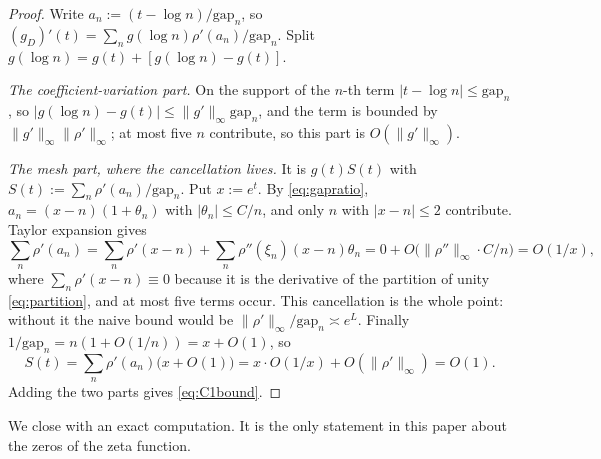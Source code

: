 \documentclass[11pt]{amsart}
\theoremstyle{definition}
\theoremstyle{remark}
\begin{document}
\begin{proof}
Write $a_n:=(t-\log n)/\mathrm{gap}_n$, so
$(g_D)'(t)=\sum_ng(\log n)\rho'(a_n)/\mathrm{gap}_n$. Split
$g(\log n)=g(t)+[g(\log n)-g(t)]$.

\emph{The coefficient-variation part.} On the support of the $n$-th term
$|t-\log n|\le\mathrm{gap}_n$, so
$|g(\log n)-g(t)|\le\|g'\|_\infty\mathrm{gap}_n$, and the term is bounded by
$\|g'\|_\infty\|\rho'\|_\infty$; at most five $n$ contribute, so this part is
$O(\|g'\|_\infty)$.

\emph{The mesh part, where the cancellation lives.} It is $g(t)S(t)$ with
$S(t):=\sum_n\rho'(a_n)/\mathrm{gap}_n$. Put $x:=e^t$. By
\eqref{eq:gapratio}, $a_n=(x-n)(1+\theta_n)$ with $|\theta_n|\le C/n$, and only
$n$ with $|x-n|\le2$ contribute. Taylor expansion gives
\[
  \sum_n\rho'(a_n)=\sum_n\rho'(x-n)+\sum_n\rho''(\xi_n)(x-n)\theta_n
   =0+O\bigl(\|\rho''\|_\infty\cdot C/n\bigr)=O(1/x),
\]
where $\sum_n\rho'(x-n)\equiv0$ because it is the derivative of the partition
of unity \eqref{eq:partition}, and at most five terms occur. This cancellation
is the whole point: without it the naive bound would be
$\|\rho'\|_\infty/\mathrm{gap}_n\asymp e^L$. Finally
$1/\mathrm{gap}_n=n(1+O(1/n))=x+O(1)$, so
\[
  S(t)=\sum_n\rho'(a_n)\bigl(x+O(1)\bigr)
   =x\cdot O(1/x)+O(\|\rho'\|_\infty)=O(1).
\]
Adding the two parts gives \eqref{eq:C1bound}.
\end{proof}

We close with an exact computation.  It is the only statement in this paper
about the zeros of the zeta function.
\end{document}
